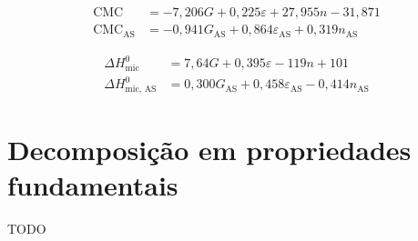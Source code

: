 		\begin{subequations}
			\begin{align}
				\textrm{CMC} &= -7,206G + 0,225\varepsilon + 27,955n-31,871  \label{eqn:PLS_cmc} \\
				\textrm{CMC}_{\textrm{AS}} &= -0,941G_\textrm{AS} + 0,864\varepsilon_\textrm{AS} +0,319n_\textrm{AS} \label{eqn:PLS_cmc_AS}
			\end{align}
		\end{subequations}
		
		\begin{subequations}
			\begin{align}
				\Delta H_\textrm{mic}^0 &= 7,64G + 0,395\varepsilon-119n+101  \label{eqn:PLS_dh} \\
				\Delta H_\textrm{mic, AS}^0 &= 0,300G_\textrm{AS} + 0,458\varepsilon_\textrm{AS} - 0,414n_\textrm{AS}  \label{eqn:PLS_dh_AS}
			\end{align}
		\end{subequations}
		
		
		
		
		\section{Decomposição em propriedades fundamentais}
		TODO
		

		
		
